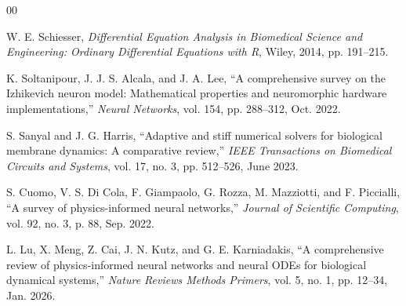 \documentclass[conference]{IEEEtran}
\begin{document}
\begin{thebibliography}{00}

 W. E. Schiesser, \emph{Differential Equation Analysis in Biomedical Science and Engineering: Ordinary Differential Equations with R}, Wiley, 2014, pp. 191--215.

 K. Soltanipour, J. J. S. Alcala, and J. A. Lee, ``A comprehensive survey on the Izhikevich neuron model: Mathematical properties and neuromorphic hardware implementations,'' \emph{Neural Networks}, vol. 154, pp. 288--312, Oct. 2022.

 S. Sanyal and J. G. Harris, ``Adaptive and stiff numerical solvers for biological membrane dynamics: A comparative review,'' \emph{IEEE Transactions on Biomedical Circuits and Systems}, vol. 17, no. 3, pp. 512--526, June 2023.

 S. Cuomo, V. S. Di Cola, F. Giampaolo, G. Rozza, M. Mazziotti, and F. Piccialli, ``A survey of physics-informed neural networks,'' \emph{Journal of Scientific Computing}, vol. 92, no. 3, p. 88, Sep. 2022.

 L. Lu, X. Meng, Z. Cai, J. N. Kutz, and G. E. Karniadakis, ``A comprehensive review of physics-informed neural networks and neural ODEs for biological dynamical systems,'' \emph{Nature Reviews Methods Primers}, vol. 5, no. 1, pp. 12--34, Jan. 2026.

\end{thebibliography}
\end{document}
